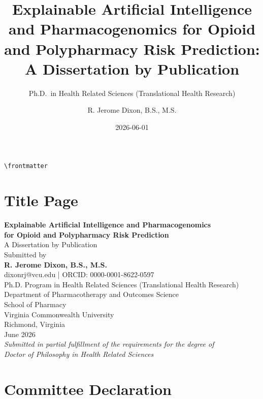 \documentclass[
  12pt,
]{book}
\title{Explainable Artificial Intelligence and Pharmacogenomics for
Opioid and Polypharmacy Risk Prediction: A Dissertation by Publication}
\subtitle{Ph.D.~in Health Related Sciences (Translational Health
Research)}
\author{R. Jerome Dixon, B.S., M.S.}
\date{2026-06-01}
\renewcommand*\contentsname{Table of contents}
\newcommand\contentsname{Table of contents}
\begin{document}
\frontmatter
\maketitle

\renewcommand*\contentsname{Table of contents}
{
\setcounter{tocdepth}{2}
\tableofcontents
}
\listoffigures
\listoftables

\mainmatter
\texttt{\textbackslash{}frontmatter}

\chapter*{Title Page}\label{title-page}

\begin{center}
\vspace*{1.5cm}
{\LARGE\textbf{Explainable Artificial Intelligence and Pharmacogenomics}}\\[0.4em]
{\LARGE\textbf{for Opioid and Polypharmacy Risk Prediction}}\\[1.2em]
{\large A Dissertation by Publication}\\[2em]
Submitted by\\[0.4em]
{\large\textbf{R. Jerome Dixon, B.S., M.S.}}\\[0.3em]
{\normalsize dixonrj@vcu.edu \quad | \quad ORCID: 0000-0001-8622-0597}\\[2em]
{\normalsize Ph.D. Program in Health Related Sciences (Translational Health Research)}\\[0.2em]
{\normalsize Department of Pharmacotherapy and Outcomes Science}\\[0.2em]
{\normalsize School of Pharmacy}\\[0.2em]
{\normalsize Virginia Commonwealth University}\\[0.2em]
{\normalsize Richmond, Virginia}\\[2em]
{\normalsize June 2026}\\[2em]
\textit{Submitted in partial fulfillment of the requirements for the degree of}\\
\textit{Doctor of Philosophy in Health Related Sciences}
\end{center}

\newpage

\chapter*{Committee Declaration}\label{committee-declaration}
\end{document}
